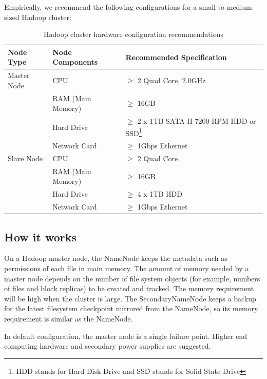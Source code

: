 Empirically, we recommend the following configurations for a small to medium sized Hadoop cluster:

\begin{table}[h]
  \centering
  \begin{tabular}{lll}
    \toprule
    \textbf{Node Type} & \textbf{Node Components} & \textbf{Recommended Specification} \\ \midrule
    Master Node & CPU	& $\ge$ 2 Quad Core, 2.0GHz \\
    & RAM (Main Memory) & $\ge$ 16GB \\
    & Hard Drive & $\ge$ 2 x 1TB SATA II 7200 RPM HDD or SSD\footnote{HDD stands for Hard Disk Drive and SSD stands for Solid State Drive} \\
    & Network Card & $\ge$ 1Gbps Ethernet \\ \midrule
    Slave Node & CPU & $\ge$ 2 Quad Core \\
    & RAM (Main Memory) & $\ge$ 16GB \\
    & Hard Drive & $\ge$ 4 x 1TB HDD \\
    & Network Card & $\ge$ 1Gbps Ethernet \\ \bottomrule
  \end{tabular}
  \caption{Hadoop cluster hardware configuration recommendations}\label{tbl:cluster.hardware}
\end{table}
\subsection*{How it works}
On a Hadoop master node, the NameNode keeps the metadata such as permissions of each file in main memory. The amount of memory needed by a master node depends on the number of file system objects (for example, numbers of files and block replicas) to be created and tracked. The memory requirement will be high when the cluster is large. The SecondaryNameNode keeps a backup for the latest filesystem checkpoint mirrored from the NameNode, so its memory requirement is similar as the NameNode.

In default configuration, the master node is a single failure point. Higher end computing hardware and secondary power supplies are suggested.

